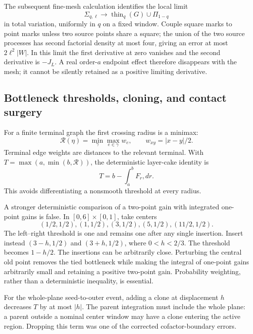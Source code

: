 \documentclass[11pt,a4paper]{article}
\theoremstyle{definition}
\theoremstyle{remark}
\numberwithin{equation}{section}
\begin{document}
The subsequent fine-mesh calculation identifies the local limit
\[
 \Sigma_{q,\ell}\longrightarrow
 \operatorname{thin}_q(G)\cup\Pi_{1-q}
\]
in total variation, uniformly in $q$ on a fixed window.  Couple square
marks to point marks unless two source points share a square; the union
of the two source processes has second factorial density at most four,
giving an error at most $2\ell^2|W|$.  In this limit the first derivative
at zero vanishes and the second derivative is $-J_L$.  A real order-$a$
endpoint effect therefore disappears with the mesh; it cannot be
silently retained as a positive limiting derivative.

\subsection{Bottleneck thresholds, cloning, and contact surgery}
\label{br:cloning}

For a finite terminal graph the first crossing radius is a minimax:
\[
 \mathcal R(\eta)=\min_{\gamma}\max_{e\in\gamma}w_e,
 \qquad w_{xy}=|x-y|/2.
\]
Terminal edge weights are distances to the relevant terminal.  With
$T=\max(a,\min(b,\mathcal R))$, the deterministic layer-cake identity is
\[
 T=b-\int_a^bF_r,dr.
\]
This avoids differentiating a nonsmooth threshold at every radius.

A stronger deterministic comparison of a two-point gain with integrated
one-point gains is false.  In $[0,6]\times[0,1]$, take centers
\[
 (1/2,1/2),(1,1/2),(3,1/2),(5,1/2),(11/2,1/2).
\]
The left--right threshold is one and remains one after any single
insertion.  Insert instead $(3-h,1/2)$ and $(3+h,1/2)$, where
$0<h<2/3$.  The threshold becomes $1-h/2$.  The insertions can be
arbitrarily close.  Perturbing the central old point removes the tied
bottleneck while making the integral of one-point gains arbitrarily
small and retaining a positive two-point gain.  Probability weighting,
rather than a deterministic inequality, is essential.

For the whole-plane seed-to-outer event, adding a clone at displacement
$h$ decreases $T$ by at most $|h|$.  The parent integration must include
the whole plane: a parent outside a nominal center window may have a
clone entering the active region.  Dropping this term was one of the
corrected cofactor-boundary errors.
\end{document}
